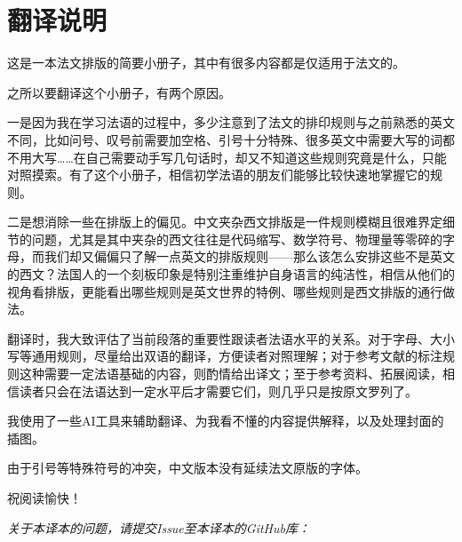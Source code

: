 \chapter*{翻译说明}

这是一本法文排版的简要小册子，其中有很多内容都是仅适用于法文的。

之所以要翻译这个小册子，有两个原因。

一是因为我在学习法语的过程中，多少注意到了法文的排印规则与之前熟悉的英文不同，比如问号、叹号前需要加空格、引号十分特殊、很多英文中需要大写的词都不用大写……在自己需要动手写几句话时，却又不知道这些规则究竟是什么，只能对照摸索。有了这个小册子，相信初学法语的朋友们能够比较快速地掌握它的规则。

二是想消除一些在排版上的偏见。中文夹杂西文排版是一件规则模糊且很难界定细节的问题，尤其是其中夹杂的西文往往是代码缩写、数学符号、物理量等零碎的字母，而我们却又偏偏只了解一点英文的排版规则——那么该怎么安排这些不是英文的西文？法国人的一个刻板印象是特别注重维护自身语言的纯洁性，相信从他们的视角看排版，更能看出哪些规则是英文世界的特例、哪些规则是西文排版的通行做法。

翻译时，我大致评估了当前段落的重要性跟读者法语水平的关系。对于字母、大小写等通用规则，尽量给出双语的翻译，方便读者对照理解；对于参考文献的标注规则这种需要一定法语基础的内容，则酌情给出译文；至于参考资料、拓展阅读，相信读者只会在法语达到一定水平后才需要它们，则几乎只是按原文罗列了。

我使用了一些AI工具来辅助翻译、为我看不懂的内容提供解释，以及处理封面的插图。

由于引号等特殊符号的冲突，中文版本没有延续法文原版的字体。

祝阅读愉快！

\vfill

\begin{center}
    \emph{
        关于本译本的问题，请提交Issue至本译本的GitHub库：
    }\\
\end{center}
